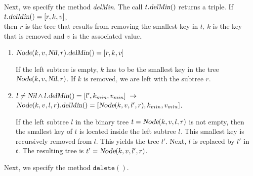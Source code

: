 Next, we specify the  method \textsl{delMin}.  The call $t.\textsl{delMin}()$ returns a triple.
If 
\\[0.2cm]
\hspace*{1.3cm}
$t.\textsl{delMin}() = [r,k,v]$,
\\[0.2cm]
then $r$ is the tree that  results from
removing the smallest key in $t$, $k$ is the key that is removed and $v$ is the associated value.
\begin{enumerate}
\item $\textsl{Node}(k, v, \textsl{Nil}, r).\textsl{delMin}() = [r, k, v]$

      If the left subtree is empty, $k$ has to be the smallest key in the tree 
      $\textsl{Node}(k, v, \textsl{Nil}, r)$.  If $k$ is removed, we are left with the subtree $r$.
\item $l\not= \textsl{Nil} \wedge l.\textsl{delMin}() = [l',k_{min}, v_{min}] \;\rightarrow$ \\[0.1cm]
       \hspace*{1.3cm} 
       $\textsl{Node}(k, v, l, r).\textsl{delMin}() = [\textsl{Node}(k, v, l', r), k_{min}, v_{min}]$.

      If the left subtree $l$ in the binary tree $t = \textsl{Node}(k, v, l, r)$
      is not empty, then the smallest key of  $t$ is located inside the left subtree $l$.
      This smallest key is recursively removed from  $l$. This yields the tree 
      $l'$.  Next,  $l$ is replaced by $l'$ in $t$.  The resulting tree is
      $t' = \textsl{Node}(k, v, l', r)$.
\end{enumerate}
Next, we specify the method $\mathtt{delete}()$.
